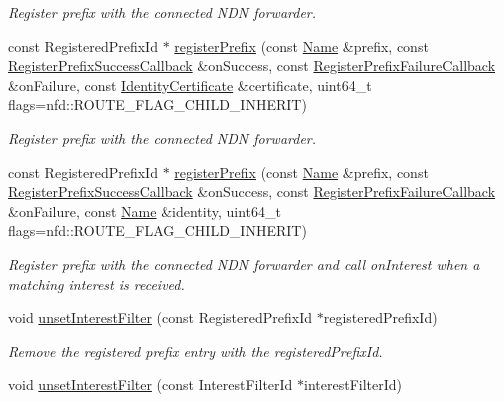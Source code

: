 \begin{DoxyCompactItemize}
\begin{DoxyCompactList}\small\item\em Register prefix with the connected N\+DN forwarder. \end{DoxyCompactList}\item 
const Registered\+Prefix\+Id $\ast$ \hyperlink{classndn_1_1Face_a547b68aa393d31c654c7626aab35eddd}{register\+Prefix} (const \hyperlink{classndn_1_1Name}{Name} \&prefix, const \hyperlink{namespacendn_a80b158f94737f73bec3f9af27161e899}{Register\+Prefix\+Success\+Callback} \&on\+Success, const \hyperlink{namespacendn_a691d213d0f708593217feeae517f3e45}{Register\+Prefix\+Failure\+Callback} \&on\+Failure, const \hyperlink{classndn_1_1IdentityCertificate}{Identity\+Certificate} \&certificate, uint64\+\_\+t flags=nfd\+::\+R\+O\+U\+T\+E\+\_\+\+F\+L\+A\+G\+\_\+\+C\+H\+I\+L\+D\+\_\+\+I\+N\+H\+E\+R\+IT)
\begin{DoxyCompactList}\small\item\em Register prefix with the connected N\+DN forwarder. \end{DoxyCompactList}\item 
const Registered\+Prefix\+Id $\ast$ \hyperlink{classndn_1_1Face_a0d6505bb8c4d4e93d1b199cd5537122a}{register\+Prefix} (const \hyperlink{classndn_1_1Name}{Name} \&prefix, const \hyperlink{namespacendn_a80b158f94737f73bec3f9af27161e899}{Register\+Prefix\+Success\+Callback} \&on\+Success, const \hyperlink{namespacendn_a691d213d0f708593217feeae517f3e45}{Register\+Prefix\+Failure\+Callback} \&on\+Failure, const \hyperlink{classndn_1_1Name}{Name} \&identity, uint64\+\_\+t flags=nfd\+::\+R\+O\+U\+T\+E\+\_\+\+F\+L\+A\+G\+\_\+\+C\+H\+I\+L\+D\+\_\+\+I\+N\+H\+E\+R\+IT)
\begin{DoxyCompactList}\small\item\em Register prefix with the connected N\+DN forwarder and call on\+Interest when a matching interest is received. \end{DoxyCompactList}\item 
void \hyperlink{classndn_1_1Face_a63c8cf621a1208f3a9a0eb1a21b476e9}{unset\+Interest\+Filter} (const Registered\+Prefix\+Id $\ast$registered\+Prefix\+Id)
\begin{DoxyCompactList}\small\item\em Remove the registered prefix entry with the registered\+Prefix\+Id. \end{DoxyCompactList}\item 
void \hyperlink{classndn_1_1Face_ac1d18e9a1ffe8aed034647600549edf7}{unset\+Interest\+Filter} (const Interest\+Filter\+Id $\ast$interest\+Filter\+Id)

\end{DoxyCompactItemize}
